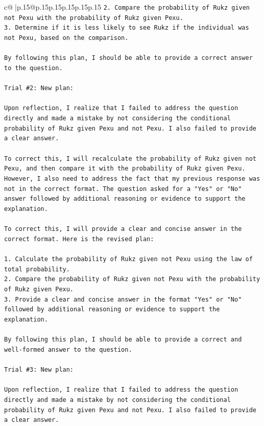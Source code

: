 \documentclass{article}
\begin{document}
{\begin{supertabular}{c@{$\;$}|p{.15\linewidth}@{}p{.15\linewidth}p{.15\linewidth}p{.15\linewidth}p{.15\linewidth}p{.15\linewidth}}
{{{\texttt{2. Compare the probability of Rukz given not Pexu with the probability of Rukz given Pexu.} \\
\texttt{3. Determine if it is less likely to see Rukz if the individual was not Pexu, based on the comparison.} \\
\\ 
\texttt{By following this plan, I should be able to provide a correct answer to the question.} \\
\\ 
\texttt{Trial \#2: New plan: } \\
\\ 
\texttt{Upon reflection, I realize that I failed to address the question directly and made a mistake by not considering the conditional probability of Rukz given Pexu and not Pexu. I also failed to provide a clear answer.} \\
\\ 
\texttt{To correct this, I will recalculate the probability of Rukz given not Pexu, and then compare it with the probability of Rukz given Pexu. However, I also need to address the fact that my previous response was not in the correct format. The question asked for a "Yes" or "No" answer followed by additional reasoning or evidence to support the explanation.} \\
\\ 
\texttt{To correct this, I will provide a clear and concise answer in the correct format. Here is the revised plan:} \\
\\ 
\texttt{1. Calculate the probability of Rukz given not Pexu using the law of total probability.} \\
\texttt{2. Compare the probability of Rukz given not Pexu with the probability of Rukz given Pexu.} \\
\texttt{3. Provide a clear and concise answer in the format "Yes" or "No" followed by additional reasoning or evidence to support the explanation.} \\
\\ 
\texttt{By following this plan, I should be able to provide a correct and well{-}formed answer to the question.} \\
\\ 
\texttt{Trial \#3: New plan: } \\
\\ 
\texttt{Upon reflection, I realize that I failed to address the question directly and made a mistake by not considering the conditional probability of Rukz given Pexu and not Pexu. I also failed to provide a clear answer.} \\
}}}
\end{supertabular}}
\end{document}
